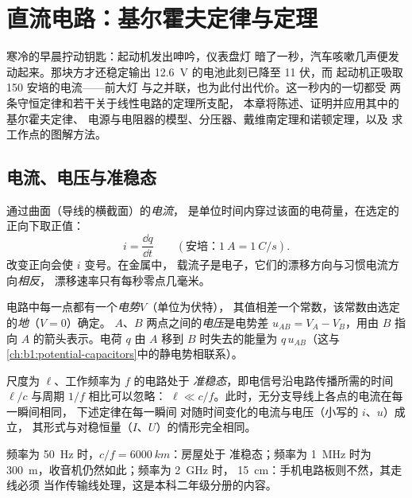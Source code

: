\chapter{直流电路：基尔霍夫定律与定理}\label{ch:b1:dc-circuits}

寒冷的早晨拧动钥匙：起动机发出呻吟，仪表盘灯
暗了一秒，汽车咳嗽几声便发动起来。那块方才还稳定输出
\qty{12.6}{V} 的电池此刻已降至 11 伏，而
起动机正吸取 150 安培的电流——前大灯
与之并联，也为此付出代价。这一秒内的一切都受
两条守恒定律和若干关于线性电路的定理所支配，
本章将陈述、证明并应用其中的基尔霍夫定律、
电源与电阻器的模型、分压器、戴维南定理和诺顿定理，以及
求工作点的图解方法。

\section{电流、电压与准稳态}

\begin{definition}[电流]\label{def:b1:dc-circuits:current}
通过曲面（导线的横截面）的\emph{电流}，
是单位时间内穿过该面的电荷量，在选定的
正向下取正值：
\[
i = \frac{\dd q}{\dd t} \qquad (\text{安培：} \qty{1}{A} = \qty{1}{C/s}).
\]
改变正向会使 $i$ 变号。在金属中，
载流子是电子，它们的漂移方向与习惯电流方向\emph{相反}，
漂移速率只有每秒零点几毫米。
\end{definition}

\begin{definition}[电势与电压]\label{def:b1:dc-circuits:voltage}
电路中每一点都有一个\emph{电势}$V$（单位为伏特），
其值相差一个常数，该常数由选定的\emph{地}（$V = 0$）确定。
$A$、$B$ 两点之间的\emph{电压}是电势差
$u_{AB} = V_A - V_B$，用由 $B$ 指向 $A$ 的箭头表示。电荷
$q$ 由 $A$ 移到 $B$ 时失去的能量为 $q\,u_{AB}$（这与
\cref{ch:b1:potential-capacitors}中的静电势相联系）。
\end{definition}

\begin{definition}\label{def:b1:dc-circuits:arqs}
尺度为 $\ell$、工作频率为 $f$ 的电路处于
\emph{准稳态}，即电信号沿电路传播所需的时间 $\ell/c$
与周期 $1/f$ 相比可以忽略：
$\ell \ll c/f$。此时，无分支导线上各点的电流在每一瞬间相同，
下述定律在每一瞬间
对随时间变化的电流与电压（小写的 $i$、$u$）成立，
其形式与对稳恒量（$I$、$U$）的情形完全相同。
\end{definition}

\begin{example}[准稳态有多准]\label{ex:b1:dc-circuits:arqs}
频率为 \qty{50}{Hz} 时，$c/f = \qty{6000}{km}$：房屋处于
准稳态；频率为 \qty{1}{MHz} 时为 \qty{300}{m}，收音机仍然如此；频率为 \qty{2}{GHz} 时，
\qty{15}{cm}：手机电路板则不然，其走线必须
当作传输线处理，这是本科二年级分册的内容。
\end{example}

